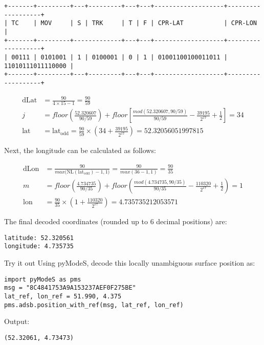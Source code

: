 \begin{verbatim}
+-------+---------+---+---------+---+---+-------------------+-------------------+
| TC    | MOV     | S | TRK     | T | F | CPR-LAT           | CPR-LON           |
+-------+---------+-------------+---+---+-------------------+-------------------+
| 00111 | 0101001 | 1 | 0100001 | 0 | 1 | 01001100100011011 | 11010111011110000 |
+-------+---------+---+---------+---+---+-------------------+-------------------+
\end{verbatim}


\begin{align}
    \mathrm{dLat} &= \frac{90}{4 \times 15 - 1} = \frac{90}{59} \\
    j &= floor \left( \frac{52.320607}{90/59} \right) + floor \left[ \frac{mod(52.320607, 90/59)}{90/59} - \frac{39195}{2^{17}}  + \frac{1}{2} \right] = 34 \\
    \mathrm{lat} &= \mathrm{lat}_\mathrm{odd} = \frac{90}{59} \times \left( 34 + \frac{39195}{2^{17}} \right) = 52.32056051997815
\end{align}
  
Next, the longitude can be calculated as follows:
  
\begin{align}
    \mathrm{dLon} &= \frac{90}{max \Big( \mathrm{NL}(\mathrm{lat}_\mathrm{odd})-1, 1 \Big)} = \frac{90}{max(36-1, 1)} = \frac{90}{35} \\
    m &= floor \left( \frac{4.734735}{90/35} \right) + floor \left( \frac{mod(4.734735, 90/35)}{90/35} - \frac{110320}{2^{17}}  + \frac{1}{2}  \right) = 1 \\
    \mathrm{lon} &= \frac{90}{35} \times \left(1 + \frac{110320}{2^{17}} \right) = 4.735735212053571
\end{align}


The final decoded coordinates (rounded up to 6 decimal positions) are:

\begin{verbatim}
latitude: 52.320561
longitude: 4.735735
\end{verbatim}

\begin{notebox}{Try it out}
Using pyModeS, decode this locally unambiguous surface position as: 

\begin{verbatim}
import pyModeS as pms
msg = "8C4841753A9A153237AEF0F275BE"
lat_ref, lon_ref = 51.990, 4.375
pms.adsb.position_with_ref(msg, lat_ref, lon_ref)
\end{verbatim}

Output: 

\begin{verbatim}
(52.32061, 4.73473)
\end{verbatim}

\end{notebox}


